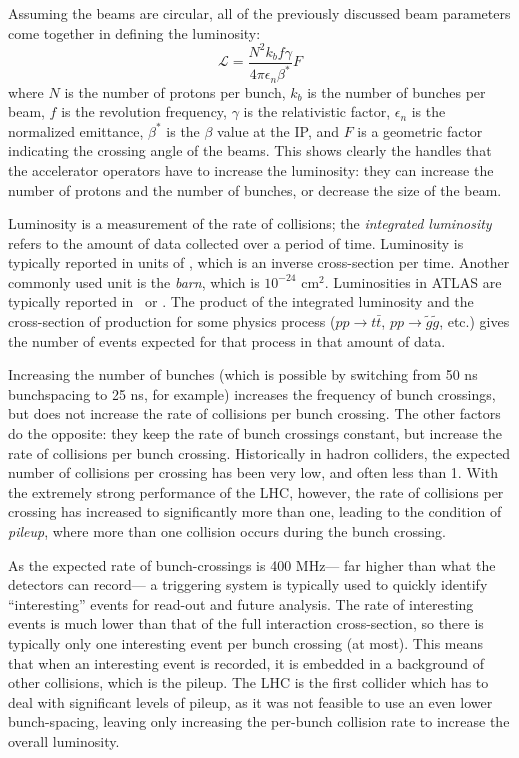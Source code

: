 Assuming the beams are circular, all of the previously discussed beam parameters come together in defining the luminosity:
%
\begin{equation}
\mathcal{L} = \frac{N^2 k_b f \gamma}{4\pi \epsilon_n \beta^*} F
\end{equation}
%
where $N$ is the number of protons per bunch, $k_b$ is the number of bunches per beam, $f$ is the revolution frequency, $\gamma$ is the relativistic factor, $\epsilon_n$ is the normalized emittance, $\beta^*$ is the $\beta$ value at the IP, and $F$ is a geometric factor indicating the crossing angle of the beams. This shows clearly the handles that the accelerator operators have to increase the luminosity: they can increase the number of protons and the number of bunches, or decrease the size of the beam.

Luminosity is a measurement of the rate of collisions; the \textit{integrated luminosity} refers to the amount of data collected over a period of time. Luminosity is typically reported in units of \lumirate, which is an inverse cross-section per time. Another commonly used unit is the \textit{barn}, which is $10^{-24}$ cm$^2$. Luminosities in ATLAS are typically reported in \ipb~or \ifb. The product of the integrated luminosity and the cross-section of production for some physics process ($pp \rightarrow t\bar{t}$, $pp \rightarrow \tilde{g}\tilde{g}$, etc.) gives the number of events expected for that process in that amount of data.

Increasing the number of bunches (which is possible by switching from 50 ns bunchspacing to 25 ns, for example) increases the frequency of bunch crossings, but does not increase the rate of collisions per bunch crossing. The other factors do the opposite: they keep the rate of bunch crossings constant, but increase the rate of collisions per bunch crossing. Historically in hadron colliders, the expected number of collisions per crossing has been very low, and often less than 1. With the extremely strong performance of the LHC, however, the rate of collisions per crossing has increased to significantly more than one, leading to the condition of \textit{pileup}, where more than one collision occurs during the bunch crossing.

As the expected rate of bunch-crossings is 400 MHz--- far higher than what the detectors can record--- a triggering system is typically used to quickly identify ``interesting'' events for read-out and future analysis. The rate of interesting events is much lower than that of the full interaction cross-section, so there is typically only one interesting event per bunch crossing (at most). This means that when an interesting event is recorded, it is embedded in a background of other collisions, which is the pileup. The LHC is the first collider which has to deal with significant levels of pileup, as it was not feasible to use an even lower bunch-spacing, leaving only increasing the per-bunch collision rate to increase the overall luminosity.

